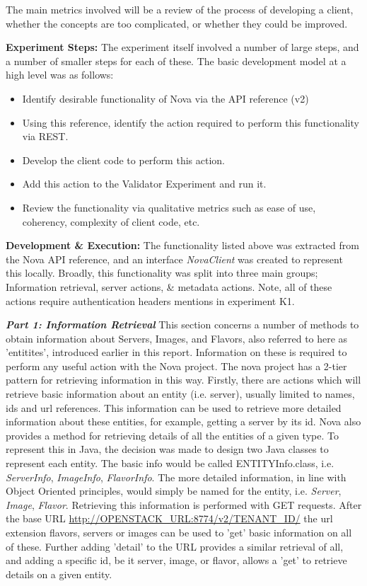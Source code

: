 The main metrics involved will be a review of the process of developing a client, whether the concepts are too complicated, or whether they could be improved. 

\textbf{Experiment Steps:}
The experiment itself involved a number of large steps, and a number of smaller steps for each of these. The basic development model at a high level was as follows:

\begin{itemize}
\item Identify desirable functionality of Nova via the API reference (v2) \cite{novaref}
\item Using this reference, identify the action required to perform this functionality via REST.
\item Develop the client code to perform this action. 
\item Add this action to the Validator Experiment and run it. 
\item Review the functionality via qualitative metrics such as ease of use, coherency, complexity of client code, etc.
\end{itemize}


\textbf{Development \& Execution:}
The functionality listed above was extracted from the Nova API reference, and an interface \textit{NovaClient} was created to represent this locally. Broadly, this functionality was split into three main groups; Information retrieval, server actions, \& metadata actions. Note, all of these actions require authentication headers mentions in experiment K1. 

\textbf{\textit{Part 1: Information Retrieval}}
This section concerns a number of methods to obtain information about Servers, Images, and Flavors, also referred to here as 'entitites', introduced earlier in this report. Information on these is required to perform any useful action with the Nova project. 
The nova project has a 2-tier pattern for retrieving information in this way. Firstly, there are actions which will retrieve basic information about an entity (i.e. server), usually limited to names, ids and url references. This information can be used to retrieve more detailed information about these entities, for example, getting a server by its id. Nova also provides a method for retrieving details of all the entities of a given type. 
To represent this in Java, the decision was made to design two Java classes to represent each entity. The basic info would be called ENTITYInfo.class, i.e. \textit{ServerInfo}, \textit{ImageInfo}, \textit{FlavorInfo}. The more detailed information, in line with Object Oriented principles, would simply be named for the entity, i.e. \textit{Server}, \textit{Image}, \textit{Flavor}. 
Retrieving this information is performed with GET requests. After the base URL %
\url{http://OPENSTACK_URL:8774/v2/TENANT_ID/}
the url extension flavors, servers or images can be used to 'get' basic information on all of these. Further adding 'detail' to the URL provides a similar retrieval of all, and adding a specific id, be it server, image, or flavor, allows a 'get' to retrieve details on a given entity.  

